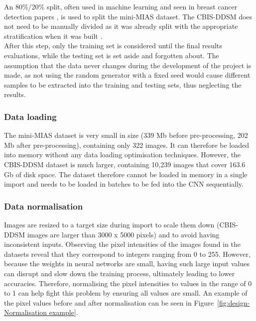 An 80\%/20\% split, often used in machine learning and seen in breast cancer detection papers \citep{Yue2018}, is used to split the mini-MIAS dataset. The CBIS-DDSM does not need to be manually divided as it was already split with the appropriate stratification when it was built \citep{Lee2017}.\\

After this step, only the training set is considered until the final results evaluations, while the testing set is set aside and forgotten about. The assumption that the data never changes during the development of the project is made, as not using the random generator with a fixed seed would cause different samples to be extracted into the training and testing sets, thus neglecting the results. 

\subsubsection{Data loading}

The mini-MIAS dataset is very small in size (339 Mb before pre-processing, 202 Mb after pre-processing), containing only 322 images. It can therefore be loaded into memory without any data loading optimisation techniques. However, the CBIS-DDSM dataset is much larger, containing 10,239 images that cover 163.6 Gb of disk space. The dataset therefore cannot be loaded in memory in a single import and needs to be loaded in batches to be fed into the CNN sequentially. %

\subsubsection{Data normalisation}

Images are resized to a target size during import to scale them down (CBIS-DDSM images are larger than 3000 x 5000 pixels)  and to avoid having inconsistent inputs. Observing the pixel intensities of the images found in the datasets reveal that they correspond to integers ranging from 0 to 255. However, because the weights in neural networks are small, having such large input values can disrupt and slow down the training process, ultimately leading to lower accuracies. Therefore, normalising the pixel intensities to values in the range of 0 to 1 can help fight this problem by ensuring all values are small. An example of the pixel values before and after normalisation can be seen in Figure~\ref{fig:design-Normalisation example}.

